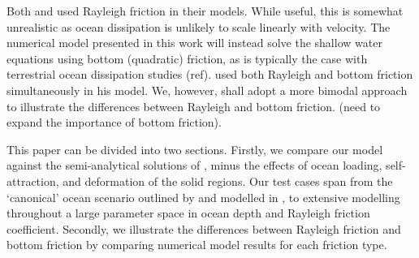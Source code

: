 Both \citet{tyler2011tidal} and \citet{matsuyama2014tidal} used Rayleigh friction in their models. While useful, this is somewhat unrealistic as ocean dissipation is unlikely to scale linearly with velocity. The numerical model presented in this work will instead solve the shallow water equations using bottom (quadratic) friction, as is typically the case with terrestrial ocean dissipation studies (ref). \citet{sears1995tidal} used both Rayleigh and bottom friction simultaneously in his model. We, however, shall adopt a more bimodal approach to illustrate the differences between Rayleigh and bottom friction. (need to expand the importance of bottom friction). 

This paper can be divided into two sections. Firstly, we compare our model against the semi-analytical solutions of \citet{matsuyama2014tidal}, minus the effects of ocean loading, self-attraction, and deformation of the solid regions. Our test cases span from the `canonical' ocean scenario outlined by \citet{sagan1982tide} and modelled in \citet{sears1995tidal}, to extensive modelling throughout a large parameter space in ocean depth and Rayleigh friction coefficient. Secondly, we illustrate the differences between Rayleigh friction and bottom friction by comparing numerical model results for each friction type.




